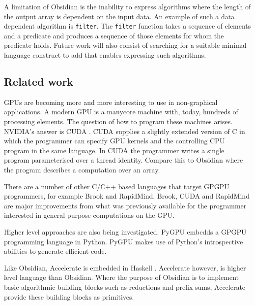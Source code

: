 A limitation of Obsidian is the inability to express algorithms where 
the length of the output array is dependent on the input data. 
An example of such a data dependent algorithm is {\tt filter}. The {\tt filter} 
function takes a sequence of elements and a predicate and produces a sequence 
of those elements for whom the predicate holds. Future work 
will also consist of searching for a suitable minimal language construct
to add that enables expressing such algorithms. 






\subsection{Related work}

GPUs are becoming more and more interesting to use in non-graphical applications.
A modern GPU is a manycore machine with, today, hundreds of processing elements. 
The question of how to program these machines arises. NVIDIA's answer is CUDA
. CUDA supplies a slightly extended version of C in which 
the programmer can specify GPU kernels and the controlling CPU program in the 
same language. In CUDA the programmer writes a single program parameterised 
over a thread identity. Compare this to Obsidian where the program describes 
a computation over an array. 

There are a number of other C/C++ based languages that target 
GPGPU programmers, for example Brook and 
RapidMind. Brook, CUDA and RapidMind are major improvements from 
what was previously available for the programmer interested in general purpose 
computations on the GPU. 

Higher level approaches are also being investigated. PyGPU embedds a GPGPU 
programming language in Python. PyGPU makes use of Python's 
introspective abilities to generate efficient code. 

Like Obsidian, Accelerate is embedded in Haskell . Accelerate 
however, is higher level language than Obsidian. Where the purpose of 
Obsidian is to implement basic algorithmic building blocks such as 
reductions and prefix sums, Accelerate provide these building blocks as 
primitives. 

